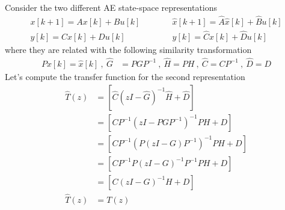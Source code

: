 \documentclass[twoside]{article}
\begin{document}
Consider the two different AE state-space representations
%
\begin{align*}
  x[k+1] = A x[k] + B u[k]  \quad & \quad \quad \hat{x}[k+1] = \hat{A} \hat{x}[k] + \hat{B} u[k] 
\\
  y[k] = C x[k] + D u[k] \quad & \quad \quad  y[k] = \hat{C} x[k] + \hat{D} u[k]
\end{align*}
%
where they are related with the following similarity transformation
%
\begin{align*}
P x[k] = \hat{x}[k] \ , \
\hat{G} &= P  G P^{-1} \ , \ \hat{H} = P  H \ , \ \hat{C} = C P^{-1} \ ,
  \ \hat{D} = D
\end{align*}
%
Let's compute the transfer function for the second representation
%
\begin{align*}
  \hat{T}(z) &= \left[ \hat{C} \left(z I - \hat{G} \right)^{-1} \hat{H}
  + \hat{D} \right]
\\
&= \left[ C P^{-1} \left(z I - P  G P^{-1} \right)^{-1} P H
  + D \right]
\\
&= \left[ C P^{-1} \left( P \left( z I -   G \right) P^{-1} \right)^{-1} P H
  + D \right]
\\
&= \left[ C P^{-1} P \left( z I -   G \right)^{-1} P^{-1} P H
  + D \right]
\\
&= \left[ C \left( z I -   G \right)^{-1} H + D \right]
\\
\hat{T}(z) &= T(z)
\end{align*}
\end{document}
